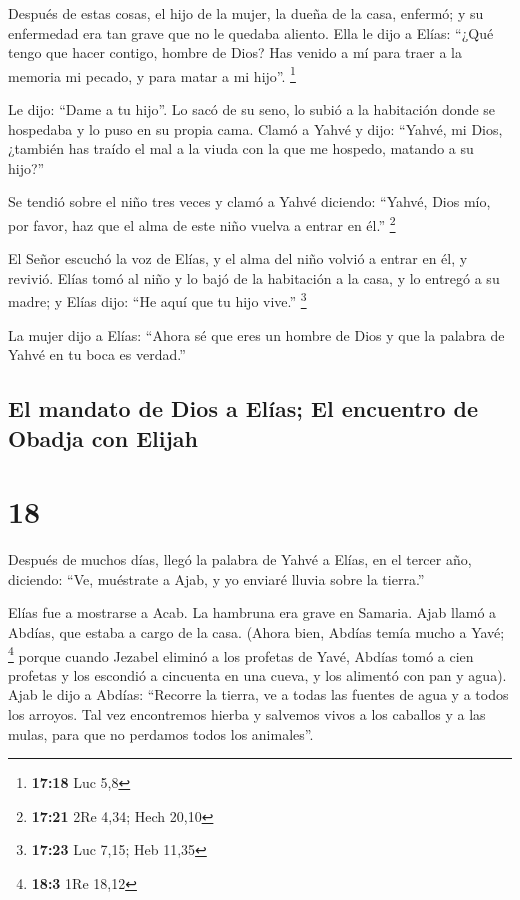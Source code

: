 Después de estas cosas, el hijo de la mujer, la dueña de
la casa, enfermó; y su enfermedad era tan grave que no le quedaba
aliento.  Ella le dijo a Elías: ``¿Qué tengo que hacer
contigo, hombre de Dios? Has venido a mí para traer a la memoria mi
pecado, y para matar a mi hijo''. \footnote{\textbf{17:18} Luc 5,8}

 Le dijo: ``Dame a tu hijo''. Lo sacó de su seno, lo
subió a la habitación donde se hospedaba y lo puso en su propia cama.
 Clamó a Yahvé y dijo: ``Yahvé, mi Dios, ¿también has
traído el mal a la viuda con la que me hospedo, matando a su hijo?''

 Se tendió sobre el niño tres veces y clamó a Yahvé
diciendo: ``Yahvé, Dios mío, por favor, haz que el alma de este niño
vuelva a entrar en él.'' \footnote{\textbf{17:21} 2Re 4,34; Hech 20,10}

 El Señor escuchó la voz de Elías, y el alma del niño
volvió a entrar en él, y revivió.  Elías tomó al niño y
lo bajó de la habitación a la casa, y lo entregó a su madre; y Elías
dijo: ``He aquí que tu hijo vive.'' \footnote{\textbf{17:23} Luc 7,15;
  Heb 11,35}

 La mujer dijo a Elías: ``Ahora sé que eres un hombre de
Dios y que la palabra de Yahvé en tu boca es verdad.''

\hypertarget{el-mandato-de-dios-a-eluxedas-el-encuentro-de-obadja-con-elijah}{%
\subsection{El mandato de Dios a Elías; El encuentro de Obadja con
Elijah}\label{el-mandato-de-dios-a-eluxedas-el-encuentro-de-obadja-con-elijah}}

\hypertarget{section-17}{%
\section{18}\label{section-17}}

 Después de muchos días, llegó la palabra de Yahvé a
Elías, en el tercer año, diciendo: ``Ve, muéstrate a Ajab, y yo enviaré
lluvia sobre la tierra.''

 Elías fue a mostrarse a Acab. La hambruna era grave en
Samaria.  Ajab llamó a Abdías, que estaba a cargo de la
casa. (Ahora bien, Abdías temía mucho a Yavé; \footnote{\textbf{18:3}
  1Re 18,12}  porque cuando Jezabel eliminó a los profetas
de Yavé, Abdías tomó a cien profetas y los escondió a cincuenta en una
cueva, y los alimentó con pan y agua).  Ajab le dijo a
Abdías: ``Recorre la tierra, ve a todas las fuentes de agua y a todos
los arroyos. Tal vez encontremos hierba y salvemos vivos a los caballos
y a las mulas, para que no perdamos todos los animales''.

